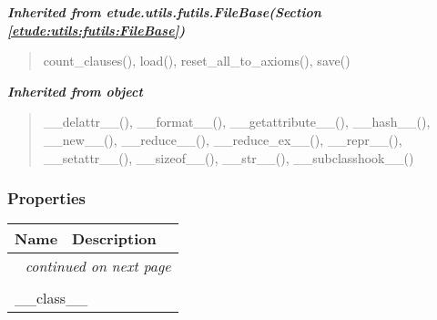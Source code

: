\large{\textbf{\textit{Inherited from etude.utils.futils.FileBase\textit{(Section \ref{etude:utils:futils:FileBase})}}}}

\begin{quote}
count\_clauses(), load(), reset\_all\_to\_axioms(), save()
\end{quote}

\large{\textbf{\textit{Inherited from object}}}

\begin{quote}
\_\_delattr\_\_(), \_\_format\_\_(), \_\_getattribute\_\_(), \_\_hash\_\_(), \_\_new\_\_(), \_\_reduce\_\_(), \_\_reduce\_ex\_\_(), \_\_repr\_\_(), \_\_setattr\_\_(), \_\_sizeof\_\_(), \_\_str\_\_(), \_\_subclasshook\_\_()
\end{quote}


  \subsubsection{Properties}

    \vspace{-1cm}
\hspace{\varindent}\begin{longtable}{|p{\varnamewidth}|p{\vardescrwidth}|l}
\cline{1-2}
\cline{1-2} \centering \textbf{Name} & \centering \textbf{Description}& \\
\cline{1-2}
\endhead\cline{1-2}\multicolumn{3}{r}{\small\textit{continued on next page}}\\\endfoot\cline{1-2}
\endlastfoot\multicolumn{2}{|l|}{\textit{Inherited from object}}\\
\multicolumn{2}{|p{\varwidth}|}{\raggedright \_\_class\_\_}\\
\cline{1-2}
\end{longtable}



